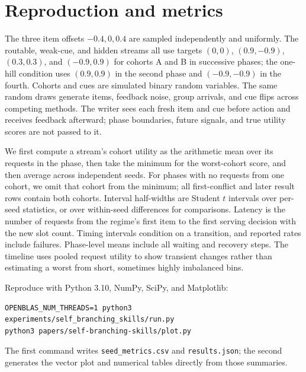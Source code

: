 \documentclass[11pt]{article}
\begin{document}
\section{Reproduction and metrics}
\label{app:protocol}
The three item offsets \(-0.4,0,0.4\) are sampled independently and uniformly. The routable, weak-cue, and hidden streams all use targets \((0,0)\), \((0.9,-0.9)\), \((0.3,0.3)\), and \((-0.9,0.9)\) for cohorts A and B in successive phases; the one-hill condition uses \((0.9,0.9)\) in the second phase and \((-0.9,-0.9)\) in the fourth. Cohorts and cues are simulated binary random variables. The same random draws generate items, feedback noise, group arrivals, and cue flips across competing methods. The writer sees each fresh item and cue before action and receives feedback afterward; phase boundaries, future signals, and true utility scores are not passed to it.

We first compute a stream's cohort utility as the arithmetic mean over its requests in the phase, then take the minimum for the worst-cohort score, and then average across independent seeds. For phases with no requests from one cohort, we omit that cohort from the minimum; all first-conflict and later result rows contain both cohorts. Interval half-widths are Student \(t\) intervals over per-seed statistics, or over within-seed differences for comparisons. Latency is the number of requests from the regime's first item to the first serving decision with the new slot count. Timing intervals condition on a transition, and reported rates include failures. Phase-level means include all waiting and recovery steps. The timeline uses pooled request utility to show transient changes rather than estimating a worst from short, sometimes highly imbalanced bins.

\noindent Reproduce with Python 3.10, NumPy, SciPy, and Matplotlib:
\begin{verbatim}
OPENBLAS_NUM_THREADS=1 python3 experiments/self_branching_skills/run.py
python3 papers/self-branching-skills/plot.py
\end{verbatim}
The first command writes \texttt{seed\_metrics.csv} and \texttt{results.json}; the second generates the vector plot and numerical tables directly from those summaries.
\end{document}
